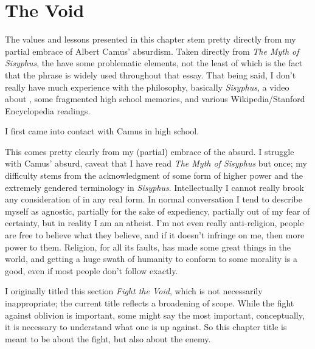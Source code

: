 \documentclass[../butidigress.tex]{subfiles}
\begin{document}
\chapter{The Void}\label{chap:thevoid}
\newpage

The values and lessons presented in this chapter stem pretty directly from my partial embrace of Albert Camus' absurdism.
Taken directly from \textit{The Myth of Sisyphus}, the  have some problematic elements, not the least of which is the fact that the phrase  is widely used throughout that essay.
That being said, I don't really have much experience with the philosophy, basically \textit{Sisyphus}, a video about , some fragmented high school memories, and various Wikipedia/Stanford Encyclopedia readings.

I first came into contact with Camus in high school.


This comes pretty clearly from my (partial) embrace of the absurd.
I struggle with Camus' absurd, caveat that I have read \textit{The Myth of Sisyphus} but once; my difficulty stems from the acknowledgment of some form of higher power and the extremely gendered terminology in \textit{Sisyphus}.
Intellectually I cannot really brook any consideration of  in any real form.
In normal conversation I tend to describe myself as agnostic, partially for the sake of expediency, partially out of my fear of certainty, but in reality I am an atheist.
I'm not even really anti-religion, people are free to believe what they believe, and if it doesn't infringe on me, then more power to them.
Religion, for all its faults, has made some great things in the world, and getting a huge swath of humanity to conform to some morality is a good, even if most people don't follow exactly.

I originally titled this section \textit{Fight the Void}, which is not necessarily inappropriate; the current title reflects a broadening of scope.
While the fight against oblivion is important, some might say the most important, conceptually, it is necessary to understand what one is up against.
So this chapter title is meant to be about the fight, but also about the enemy.
\end{document}
